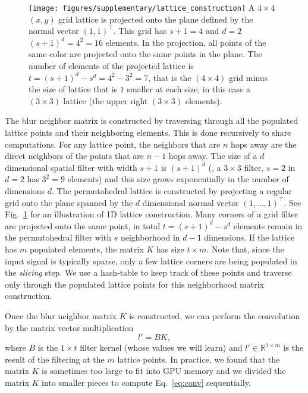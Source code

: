 \begin{figure}[t!]
  \centering
    \texttt{[image: figures/supplementary/lattice\_construction]}
  {A $4\times 4$ $(x,y)$ grid lattice is projected onto the plane defined by the normal
  vector $(1,1)^{\top}$. This grid has $s+1=4$ and $d=2$ $(s+1)^{d}=4^2=16$ elements.
  In the projection, all points of the same color are projected onto the same points in the plane.
  The number of elements of the projected lattice is $t=(s+1)^d-s^d=4^2-3^2=7$, that is
  the $(4\times 4)$ grid minus the size of lattice that is $1$ smaller at each size, in this
  case a $(3\times 3)$ lattice (the upper right $(3\times 3)$ elements).
  }
\label{fig:latticeconstruction}
\end{figure}

The blur neighbor matrix is constructed by traversing through all the populated
lattice points and their neighboring elements.
This is done recursively to share computations. For any lattice point, the neighbors that are
$n$ hops away are the direct neighbors of the points that are $n-1$ hops away.
The size of a $d$ dimensional spatial filter with width $s+1$ is $(s+1)^{d}$ (\eg, a
$3\times 3$ filter, $s=2$ in $d=2$ has $3^2=9$ elements) and this size grows
exponentially in the number of dimensions $d$. The permutohedral lattice is constructed by
projecting a regular grid onto the plane spanned by the $d$ dimensional normal vector ${(1,\ldots,1)}^{\top}$. See
Fig.~\ref{fig:latticeconstruction} for an illustration of 1D lattice construction.
Many corners of a grid filter are projected onto the same point, in total $t = {(s+1)}^{d} -
s^{d}$ elements remain in the permutohedral filter with $s$ neighborhood in $d-1$ dimensions.
If the lattice has $m$ populated elements, the
matrix $K$ has size $t\times m$. Note that, since the input signal is typically
sparse, only a few lattice corners are being populated in the \textit{slicing} step.
We use a hash-table to keep track of these points and traverse only through
the populated lattice points for this neighborhood matrix construction.

Once the blur neighbor matrix $K$ is constructed, we can perform the convolution
by the matrix vector multiplication
\begin{equation}
l' = BK,
\label{eq:conv}
\end{equation}
where $B$ is the $1 \times t$ filter kernel (whose values we will learn) and $l'\in\mathbb{R}^{1\times m}$
is the result of the filtering at the $m$ lattice points. In practice, we found that the
matrix $K$ is sometimes too large to fit into GPU memory and we divided the matrix $K$
into smaller pieces to compute Eq.~\ref{eq:conv} sequentially.

